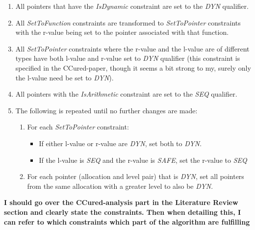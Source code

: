 \begin{enumerate}
\item All pointers that have the \textit{IsDynamic} constraint are set to the \textit{DYN} qualifier.
\item All \textit{SetToFunction} constraints are transformed to \textit{SetToPointer} constraints with the r-value being set to the pointer associated with that function.
\item All \textit{SetToPointer} constraints where the r-value and the l-value are of different types have both l-value and r-value set to \textit{DYN} qualifier (this constraint is specified in the CCured-paper, though it seems a bit strong to my, surely only the l-value need be set to \textit{DYN}).
\item All pointers with the \textit{IsArithmetic} constraint are set to the \textit{SEQ} qualifier.
\item The following is repeated until no further changes are made:
    \begin{enumerate}
        \item For each \textit{SetToPointer} constraint:
        \begin{itemize}
            \item If either l-value or r-value are \textit{DYN}, set both to \textit{DYN}.
            \item If the l-value is \textit{SEQ} and the r-value is \textit{SAFE}, set the r-value to \textit{SEQ}
        \end{itemize}
        \item For each pointer (allocation and level pair) that is \textit{DYN}, set all pointers from the same allocation with a greater level to also be \textit{DYN}.
    \end{enumerate}
\end{enumerate}

\textbf{I should go over the CCured-analysis part in the Literature Review section and clearly state the constraints. Then when detailing this, I can refer to which constraints which part of the algorithm are fulfilling}


